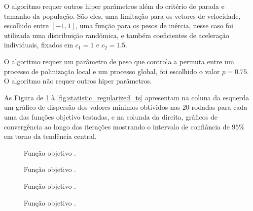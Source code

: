 \documentclass[a4paper, 11pt]{article}
\begin{document}
O algoritmo  requer outros hiper parâmetros além do critério de parada e tamanho da população.
São eles, uma limitação para os vetores de velocidade, escolhido entre \( [-1, 1] \), uma função para
os pesos de inércia, nesse caso foi utilizada uma distribuição randômica, e também coeficientes de aceleração
individuais, fixados em \( c_1=1 \) e \(c_2=1.5 \).

O algoritmo  requer um parâmetro de peso que controla a permuta entre um processo de
polinização local e um processo global, foi escolhido o valor \( p=0.75 \). O algoritmo  não requer
outros hiper parâmetros.

As Figura de \ref{fig:statistic_easom} à \ref{fig:statistic_regularized_ts} apresentam na coluna da esquerda
um gráfico de dispersão dos valores mínimos obtividos nas 20 rodadas para cada uma das funções objetivo testadas, e 
na colunda da direita, gráficos de convergência ao longo das iterações mostrando o intervalo de confiância 
de \( 95 \% \) em torno da tendência central.

\begin{figure}[!ht]
    \centering
    \caption{Função objetivo .}
    \label{fig:statistic_easom}
    \subfloat[Dispersão.]{%
        \scalebox{.8}{}
    }
    \subfloat[Convergência.]{%
        \scalebox{.8}{}
    }
\end{figure}

\begin{figure}[!ht]
    \centering
    \caption{Função objetivo .}
    \label{fig:statistic_eggholder}
    \subfloat[Dispersão.]{%
        \scalebox{.8}{}
    }
    \subfloat[Convergência.]{%
        \scalebox{.8}{}
    }
\end{figure}

\begin{figure}[!ht]
    \centering
    \caption{Função objetivo .}
    \label{fig:statistic_griewank}
    \subfloat[Dispersão.]{%
        \scalebox{.8}{}
    }
    \subfloat[Convergência.]{%
        \scalebox{.8}{}
    }
\end{figure}

\begin{figure}[!ht]
    \centering
    \caption{Função objetivo .}
    \label{fig:statistic_shubert}
    \subfloat[Dispersão.]{%
        \scalebox{.8}{}
    }
    \subfloat[Convergência.]{%
        \scalebox{.8}{}
    }
\end{figure}
\end{document}
